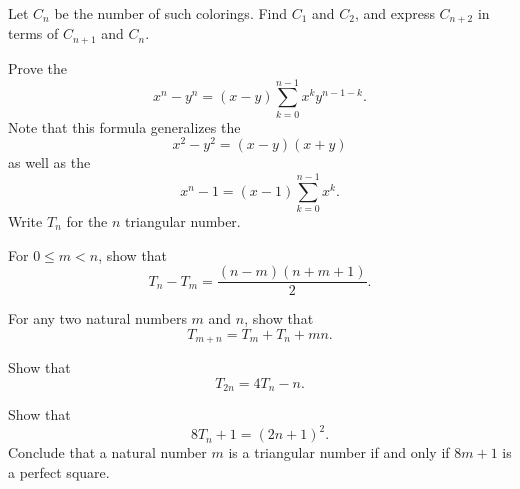 \begin{starter}
\begin{center}
  \end{center}
  Let $C_n$ be the number of such colorings. Find $C_1$ and $C_2$, and express $C_{n+2}$ in terms of $C_{n+1}$ and $C_{n}$.
\end{starter}

\begin{routine}
  \exercise \label{exercise:difference-of-powers}
  Prove the 
  \begin{equation*}
    x^n-y^n=(x-y)\sum_{k=0}^{n-1}x^ky^{n-1-k}.
  \end{equation*}
  Note that this formula generalizes the 
  \begin{equation*}
    x^2-y^2 = (x-y)(x+y)
  \end{equation*}
  as well as the 
  \begin{equation*}
    x^n-1=(x-1)\sum_{k=0}^{n-1} x^k.
  \end{equation*}
  \exercise \label{exercise:identities-triangular-numbers}Write $T_n$ for the $n$\supth{} triangular number.
  \begin{subexenum}
  \item For $0\leq m<n$, show that
    \begin{equation*}
      T_n-T_m=\frac{(n-m)(n+m+1)}{2}.
    \end{equation*}
  \item For any two natural numbers $m$ and $n$, show that
    \begin{equation*}
      T_{m+n}=T_{m}+T_n+mn.
    \end{equation*}
  \item Show that
    \begin{equation*}
      T_{2n}=4T_n-n.
    \end{equation*}
  \item Show that
    \begin{equation*}
      8T_n+1=(2n+1)^2.
    \end{equation*}
    Conclude that a natural number $m$ is a triangular number if and only if $8m+1$ is a perfect square.

\end{subexenum}
\end{routine}
